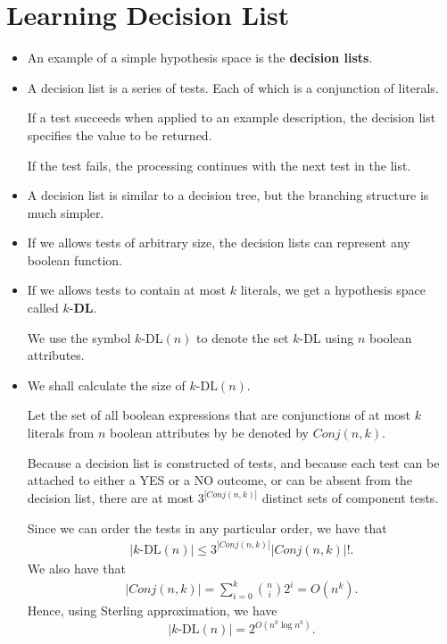 \documentclass[10pt]{article}
\begin{document}
\section{Learning Decision List}

\begin{itemize}
    \item An example of a simple hypothesis space is
    the {\bf decision lists}.
    
    \item A decision list is a series of tests. Each
        of which is a conjunction of literals.
        
        If a test succeeds when applied to an example description,
        the decision list specifies the value to be returned.
        
        If the test fails, the processing continues with
        the next test in the list.
        
    \item A decision list is similar to a decision tree, but
        the branching structure is much simpler.
        
    \item If we allows tests of arbitrary size, the decision
        lists can represent any boolean function.
        
    \item If we allows tests to contain at most $k$ literals,
        we get a hypothesis space called $k$-{\bf DL}.
        
        We use the symbol $\mbox{$k$-DL}(n)$ to denote
        the set $k$-DL using $n$ boolean attributes.
        
    \item We shall calculate the size of $\mbox{$k$-DL}(n)$.
    
        Let the set of all boolean expressions that
        are conjunctions of at most $k$ literals from $n$
        boolean attributes by be denoted by $Conj(n,k)$.
        
        Because a decision list is constructed of tests, and
        because each test can be attached to either a
        YES or a NO outcome, or can be absent from the decision
        list, there are at most $3^{|Conj(n,k)|}$
        distinct sets of component tests.
        
        Since we can order the tests in any particular order, 
        we have that
        \begin{align*}
            |\mbox{$k$-DL}(n)| \leq 3^{|Conj(n,k)|}|Conj(n,k)|!.
        \end{align*}
        We also have that
        \begin{align*}
            |Conj(n,k)| = \sum_{i=0}^k {n \choose i} 2^i = O(n^k).
        \end{align*}
        Hence, using Sterling approximation, we have
        $$|\mbox{$k$-DL}(n)| = 2^{O(n^k \log n^k)}.$$
        

\end{itemize}
\end{document}

